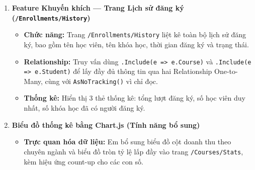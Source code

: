 \begin{enumerate}[label = \textbf{\arabic*.}, leftmargin = 0.5cm]
\begin{itemize}[label = $\bullet$, leftmargin = 0.3cm]
            \item \textbf{Service:} \texttt{CourseService.FilterAsync} nhận tham số từ Controller, gọi Repository và map kết quả sang \texttt{CourseListItemViewModel}.

            \item \textbf{Controller:} \texttt{CoursesController.Filter} nhận input từ Query String, gọi Service và trả View --- không chứa logic lọc trực tiếp.

            \item \textbf{View:} Trang \texttt{/Courses/Filter} có form chọn chuyên ngành, nhập học phí tối thiểu và tối đa; kết quả hiển thị dạng card. Dưới kết quả in ra câu EF Core query tương đương để minh họa luồng xử lý.

            \item \textbf{Layer:} Phân chia đúng luồng Controller $\rightarrow$ Service $\rightarrow$ Repository $\rightarrow$ DbContext, mỗi tầng chỉ làm đúng trách nhiệm của mình.
        \end{itemize}

    \item \textbf{Feature Khuyến khích --- Trang Lịch sử đăng ký (\texttt{/Enrollments/History})}
        \begin{itemize}[label = $\bullet$, leftmargin = 0.3cm]
            \item \textbf{Chức năng:} Trang \texttt{/Enrollments/History} liệt kê toàn bộ lịch sử đăng ký, bao gồm tên học viên, tên khóa học, thời gian đăng ký và trạng thái.

            \item \textbf{Relationship:} Truy vấn dùng \texttt{.Include(e => e.Course)} và \texttt{.Include(e => e.Student)} để lấy đầy đủ thông tin qua hai Relationship One-to-Many, cùng với \texttt{AsNoTracking()} vì chỉ đọc.

            \item \textbf{Thống kê:} Hiển thị 3 thẻ thống kê: tổng lượt đăng ký, số học viên duy nhất, số khóa học đã có người đăng ký.
        \end{itemize}

    \item \textbf{Biểu đồ thống kê bằng Chart.js (Tính năng bổ sung)}
        \begin{itemize}[label = $\bullet$, leftmargin = 0.3cm]
            \item \textbf{Trực quan hóa dữ liệu:} Em bổ sung biểu đồ cột doanh thu theo chuyên ngành và biểu đồ tròn tỷ lệ lấp đầy vào trang \texttt{/Courses/Stats}, kèm hiệu ứng count-up cho các con số.


\end{itemize}
\end{enumerate}

